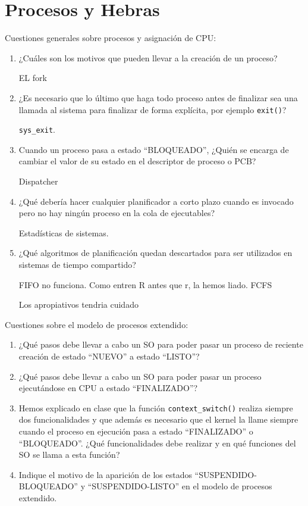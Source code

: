 \section{Procesos y Hebras}

\begin{ejercicio}
    Cuestiones generales sobre procesos y asignación de CPU:
    \begin{enumerate}
        \item ¿Cuáles son los motivos que pueden llevar a la creación de un proceso?

        EL fork
        
        \item ¿Es necesario que lo último que haga todo proceso antes de finalizar sea una llamada al sistema para finalizar de forma explícita, por ejemplo \verb|exit()|?

        \verb|sys_exit|.
        
        \item Cuando un proceso pasa a estado ``BLOQUEADO'', ¿Quién se encarga de cambiar el valor de su estado en el descriptor de proceso o PCB?

        Dispatcher
        
        \item ¿Qué debería hacer cualquier planificador a corto plazo cuando es invocado pero no hay ningún proceso en la cola de ejecutables?

        Estadísticas de sistemas.
        
        \item ¿Qué algoritmos de planificación quedan descartados para ser utilizados en sistemas de tiempo compartido?

        FIFO no funciona. Como entren R antes que r, la hemos liado. FCFS

        Los apropiativos tendria cuidado
    \end{enumerate}
\end{ejercicio}


\begin{ejercicio}
    Cuestiones sobre el modelo de procesos extendido:
    \begin{enumerate}
        \item ¿Qué pasos debe llevar a cabo un SO para poder pasar un proceso de reciente creación de estado ``NUEVO'' a estado ``LISTO''?
        \item ¿Qué pasos debe llevar a cabo un SO para poder pasar un proceso ejecutándose en CPU a estado ``FINALIZADO''?
        \item Hemos explicado en clase que la función \verb|context_switch()| realiza siempre dos funcionalidades y que además es necesario que el kernel la llame siempre cuando el proceso en ejecución pasa a estado ``FINALIZADO'' o ``BLOQUEADO''. ¿Qué funcionalidades debe realizar y en qué funciones del SO se llama a esta función?
        \item Indique el motivo de la aparición de los estados ``SUSPENDIDO-BLOQUEADO'' y ``SUSPENDIDO-LISTO'' en el modelo de procesos extendido.
    \end{enumerate}
\end{ejercicio}

